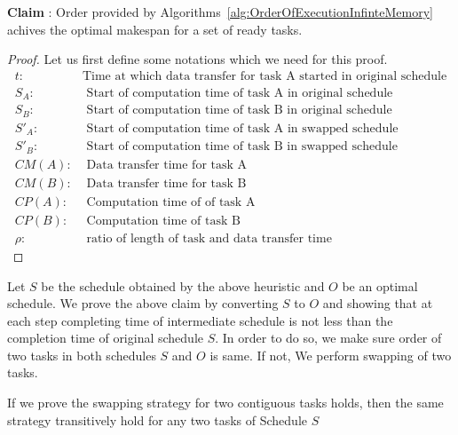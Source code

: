 \documentclass[runningheads]{llncs} %
\begin{document}
	
	\noindent \textbf{Claim} : Order provided by Algorithms~\ref{alg:OrderOfExecutionInfinteMemory} achives the optimal makespan for a set of ready tasks.
	
	\begin{proof}
		Let us first define some notations which we need for this proof.
		\begin{align*}
		t : & \text{Time at which data transfer for task A started in original schedule}\\
		S_A : & \text{ Start of computation  time of task A in original schedule}\\
		S_B : & \text{ Start of computation time of task B in original schedule}\\
		S'_A : & \text{ Start of computation time of task A in swapped schedule}\\
		S'_B : & \text{ Start of computation time of task B in swapped schedule}\\
		CM(A) : & \text{ Data transfer time for task A}\\
		CM(B) : & \text{ Data transfer time for task B}\\
		CP(A) : & \text{ Computation time of of task A}\\
		CP(B) : & \text{ Computation time of task B}\\
		\rho : & \text{ ratio of length of task and data transfer time}
		\end{align*}
	\end{proof}
	
	Let $S$ be the schedule obtained by the above heuristic and $O$ be an optimal schedule. We prove the above claim by converting $S$ to $O$ and showing that at each step completing time of intermediate schedule is not less than the completion time of original schedule $S$. In order to do so, we make sure order of two tasks in both schedules $S$ and $O$ is same. If not, We perform swapping of two tasks.
	
	\noindent If we prove the swapping strategy for two contiguous tasks holds, then the same strategy transitively hold for any two tasks of Schedule $S$ 
	
\end{document}
